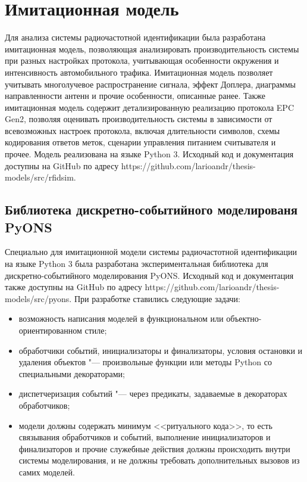 \section{Имитационная модель}\label{sec:ch2_sim}
Для анализа системы радиочастотной идентификации была разработана имитационная модель, позволяющая анализировать производительность системы при разных настройках протокола, учитывающая особенности окружения и интенсивность автомобильного трафика. Имитационная модель позволяет учитывать многолучевое распространение сигнала, эффект Доплера, диаграммы направленности антенн и прочие особенности, описанные ранее. Также имитационная модель содержит детализированную реализацию протокола EPC Gen2, позволяя оценивать производительность системы в зависимости от всевозможных настроек протокола, включая длительности символов, схемы кодирования ответов меток, сценарии управления питанием считывателя и прочее. Модель реализована на языке Python 3. Исходный код и документация доступны на GitHub по адресу https://github.com/larioandr/thesis-models/src/rfidsim.



\subsection{Библиотека дискретно-событийного моделированя PyONS}
Специально для имитационной модели системы радиочастотной идентификации на языке Python 3 была разработана экспериментальная библиотека для дискретно-событийного моделирования PyONS. Исходный код и документация также доступны на GitHub по адресу https://github.com/larioandr/thesis-models/src/pyons. При разработке ставились следующие задачи:

\begin{itemize}
\item возможность написания моделей в функциональном или объектно-ориентированном стиле;
\item обработчики событий, инициализаторы и финализаторы, условия остановки и удаления объектов "--- произвольные функции или методы Python со специальными декораторами;
\item диспетчеризация событий "--- через предикаты, задаваемые в декораторах обработчиков;
\item модели должны содержать минимум <<ритуального кода>>, то есть связывания обработчиков и событий, выполнение инициализаторов и финализаторов и прочие служебные действия должны происходить внутри системы моделирования, и не должны требовать дополнительных вызовов из самих моделей.
\end{itemize}

